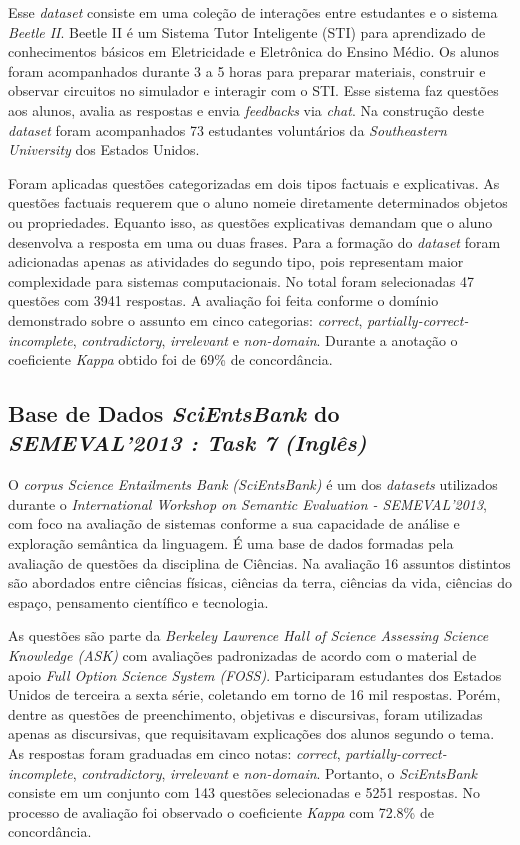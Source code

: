 Esse \textit{dataset} consiste em uma coleção de interações entre estudantes e o sistema \textit{Beetle II}. Beetle II é um Sistema Tutor Inteligente (STI) para aprendizado de conhecimentos básicos em Eletricidade e Eletrônica do Ensino Médio. Os alunos foram acompanhados durante 3 a 5 horas para preparar materiais, construir e observar circuitos no simulador e interagir com o STI. Esse sistema faz questões aos alunos, avalia as respostas e envia \textit{feedbacks} via \textit{chat}. Na construção deste \textit{dataset} foram acompanhados 73 estudantes voluntários da \textit{Southeastern University} dos Estados Unidos.

Foram aplicadas questões categorizadas em dois tipos factuais e explicativas. As questões factuais requerem que o aluno nomeie diretamente determinados objetos ou propriedades. Equanto isso, as questões explicativas demandam que o aluno desenvolva a resposta em uma ou duas frases. Para a formação do \textit{dataset} foram adicionadas apenas as atividades do segundo tipo, pois representam maior complexidade para sistemas computacionais. No total foram selecionadas 47 questões com 3941 respostas. A avaliação foi feita conforme o domínio demonstrado sobre o assunto em cinco categorias: \textit{correct}, \textit{partially-correct-incomplete}, \textit{contradictory}, \textit{irrelevant} e \textit{non-domain}. Durante a anotação o coeficiente \textit{Kappa} obtido foi de 69\% de concordância.

\subsection{Base de Dados \textit{SciEntsBank} do \textit{SEMEVAL'2013 : Task 7} \textit{(Inglês)}}
\label{scientsbank-db}

O \textit{corpus Science Entailments Bank (SciEntsBank)} \cite{dzikovska2012} é um dos \textit{datasets} utilizados durante o \textit{International Workshop on Semantic Evaluation - SEMEVAL'2013}, com foco na avaliação de sistemas conforme a sua capacidade de análise e exploração semântica da linguagem. É uma base de dados formadas pela avaliação de questões da disciplina de Ciências. Na avaliação 16 assuntos distintos são abordados entre ciências físicas, ciências da terra, ciências da vida, ciências do espaço, pensamento científico e tecnologia. 

As questões são parte da \textit{Berkeley Lawrence Hall of Science Assessing Science Knowledge (ASK)} com avaliações padronizadas de acordo com o material de apoio \textit{Full Option Science System (FOSS)}. Participaram estudantes dos Estados Unidos de terceira a sexta série, coletando em torno de 16 mil respostas. Porém, dentre as questões de preenchimento, objetivas e discursivas, foram utilizadas apenas as discursivas, que requisitavam explicações dos alunos segundo o tema. As respostas foram graduadas em cinco notas: \textit{correct}, \textit{partially-correct-incomplete}, \textit{contradictory}, \textit{irrelevant} e \textit{non-domain}. Portanto, o \textit{SciEntsBank} consiste em um conjunto com 143 questões selecionadas e 5251 respostas. No processo de avaliação foi observado o coeficiente \textit{Kappa} com 72.8\% de concordância.

